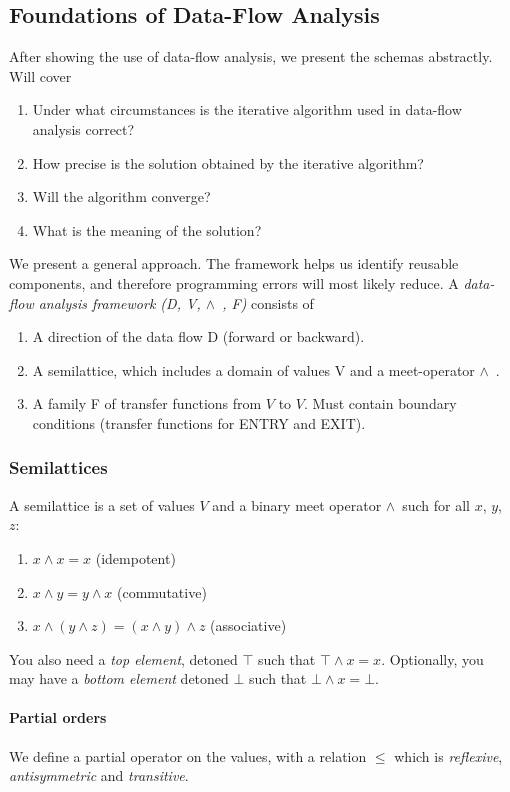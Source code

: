 \documentclass{article}
\newcommand{\meet}{$\wedge$~}
\begin{document}
\subsection{Foundations of Data-Flow Analysis} %
\label{sub:Foundations of Data-Flow Analysis}
After showing the use of data-flow analysis, we present the schemas abstractly. Will cover
\begin{enumerate}
	\item Under what circumstances is the iterative algorithm used in data-flow analysis correct?
	\item How precise is the solution obtained by the iterative algorithm?
	\item Will the algorithm converge?
	\item What is the meaning of the solution?
\end{enumerate}
We present a general approach. The framework helps us identify reusable components, and therefore programming errors will most likely reduce. A \emph{data-flow analysis framework (D, V, \meet, F)} consists of
\begin{enumerate}
	\item A direction of the data flow D (forward or backward).
	\item A semilattice, which includes a domain of values V and a meet-operator \meet.
	\item A family F of transfer functions from $V$ to $V$. Must contain boundary conditions (transfer functions for ENTRY and EXIT).
\end{enumerate}

\subsubsection{Semilattices} %
\label{ssub:Semilattices}
A semilattice is a set of values $V$ and a binary meet operator \meet such for all $x$, $y$, $z$:
\begin{enumerate}
	\item $x \wedge x = x$ (idempotent)
	\item $x \wedge y = y \wedge x$ (commutative)
	\item $x \wedge (y \wedge z) = (x \wedge y) \wedge z$ (associative)
\end{enumerate}
You also need a \emph{top element}, detoned $\top$ such that $\top \wedge x = x$. Optionally, you may have a \emph{bottom element} detoned $\bot$ such that $\bot \wedge x = \bot$.

\paragraph{Partial orders} %
\label{par:Partial orders}
We define a partial operator on the values, with a relation $\le$ which is \emph{reflexive}, \emph{antisymmetric} and \emph{transitive}.
\end{document}
